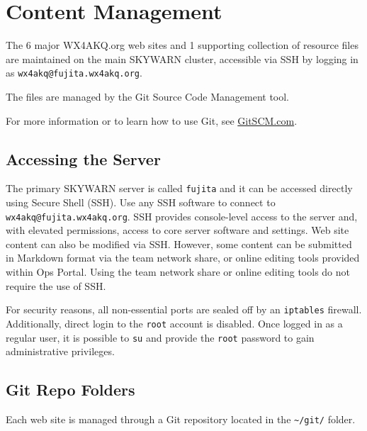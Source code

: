 \documentclass[pdflatex,letterpaper,twoside,12pt]{book}
\begin{document}
\chapter{Content Management}


The 6 major WX4AKQ.org web sites and 1 supporting collection of resource files are maintained on the main SKYWARN cluster, accessible via SSH by logging in as \texttt{wx4akq@fujita.wx4akq.org}.

The files are managed by the Git Source Code Management tool.  

For more information or to learn how to use Git, see \href{http://www.gitscm.com/}{GitSCM.com}.


\section{Accessing the Server}

The primary SKYWARN server is called \texttt{fujita} and it can be accessed directly using Secure Shell (SSH).  Use any SSH software to connect to \texttt{wx4akq@fujita.wx4akq.org}.  SSH provides console-level access to the server and, with elevated permissions, access to core server software and settings.  Web site content can also be modified via SSH.  However, some content can be submitted in Markdown format via the team network share, or online editing tools provided within Ops Portal.  Using the team network share or online editing tools do not require the use of SSH.

For security reasons, all non-essential ports are sealed off by an \texttt{iptables} firewall.  Additionally, direct login to the \texttt{root} account is disabled.  Once logged in as a regular user, it is possible to \texttt{su} and provide the \texttt{root} password to gain administrative privileges.


\section{Git Repo Folders}

Each web site is managed through a Git repository located in the \texttt{\~\//git/} folder.
\end{document}
